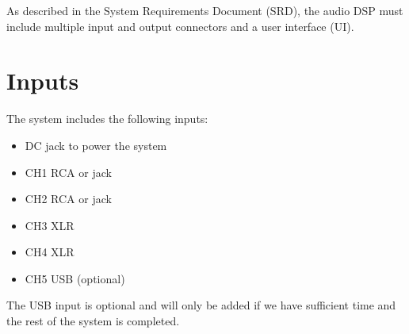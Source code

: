 As described in the System Requirements Document (SRD), the audio DSP must include multiple input and output connectors and a user interface (UI).

\section{Inputs}
The system includes the following inputs:
\begin{itemize}
    \item DC jack to power the system
    \item CH1 RCA or jack
    \item CH2 RCA or jack
    \item CH3 XLR
    \item CH4 XLR
    \item CH5 USB (optional)
\end{itemize}
The USB input is optional and will only be added if we have sufficient time and the rest of the system is completed.